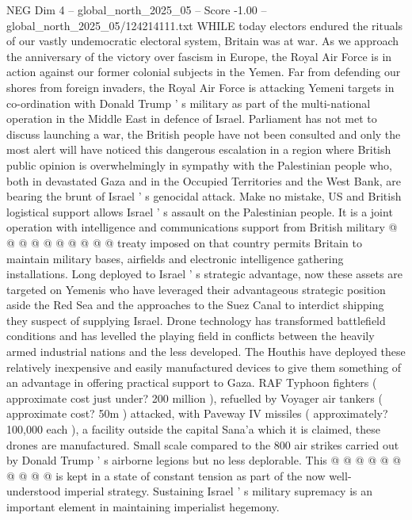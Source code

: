 \begin{textsample}{NEG Dim 4 – global\_north\_2025\_05 – Score -1.00 – global\_north\_2025\_05/124214111.txt}  \label{ex:f4_neg_262}
WHILE today electors endured the rituals of our vastly undemocratic electoral system, Britain was at war.
As we approach the anniversary of the victory over fascism in Europe, the Royal Air Force is in action against our former colonial subjects in the Yemen.
Far from defending our shores from foreign invaders, the Royal Air Force is attacking Yemeni targets in co-ordination with Donald Trump ' s military as part of the multi-national operation in the Middle East in defence of Israel.
Parliament has not met to discuss launching a war, the British people have not been consulted and only the most alert will have noticed this dangerous escalation in a region where British public opinion is overwhelmingly in sympathy with the Palestinian people who, both in devastated Gaza and in the Occupied Territories and the West Bank, are bearing the brunt of Israel ' s genocidal attack.
Make no mistake, US and British logistical support allows Israel ' s assault on the Palestinian people.
It is a joint operation with intelligence and communications support from British military @ @ @ @ @ @ @ @ @ @ treaty imposed on that country permits Britain to maintain military bases, airfields and electronic intelligence gathering installations.
Long deployed to Israel ' s strategic advantage, now these assets are targeted on Yemenis who have leveraged their advantageous strategic position aside the Red Sea and the approaches to the Suez Canal to interdict shipping they suspect of supplying Israel.
Drone technology has transformed battlefield conditions and has levelled the playing field in conflicts between the heavily armed industrial nations and the less developed.
The Houthis have deployed these relatively inexpensive and easily manufactured devices to give them something of an advantage in offering practical support to Gaza.
RAF Typhoon fighters ( approximate cost just under? 200 million ), refuelled by Voyager air tankers ( approximate cost? 50m ) attacked, with Paveway IV missiles ( approximately? 100,000 each ), a facility outside the capital Sana'a which it is claimed, these drones are manufactured.
Small scale compared to the 800 air strikes carried out by Donald Trump ' s airborne legions but no less deplorable.
This @ @ @ @ @ @ @ @ @ @ is kept in a state of constant tension as part of the now well-understood imperial strategy.
Sustaining Israel ' s military supremacy is an important element in maintaining imperialist hegemony.

\end{textsample}
